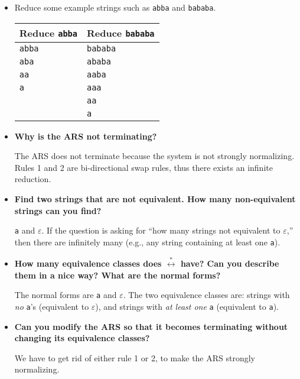 \documentclass{article}
\theoremstyle{theorem}
\theoremstyle{definition}
\theoremstyle{remark}
\begin{document}
\begin{itemize}
  \item Reduce some example strings such as \texttt{abba} and \texttt{bababa}.

  \begin{center}
  \begin{tabular}{l l}
  \textbf{Reduce \texttt{abba}} & \textbf{Reduce \texttt{bababa}}\\ \hline
  \texttt{abba}                 & \texttt{bababa} \\
  \texttt{aba}                  & \texttt{ababa}  \\
  \texttt{aa}                   & \texttt{aaba}   \\
  \texttt{a}                    & \texttt{aaa}    \\
                                & \texttt{aa}     \\
                                & \texttt{a}
  \end{tabular}
  \end{center}

  \item \textbf{Why is the ARS not terminating?}

  The ARS does not terminate because the system is not strongly normalizing. Rules 1 and 2 are bi-directional swap rules, thus there exists an infinite reduction.

  \item \textbf{Find two strings that are not equivalent. How many non-equivalent strings can you find?}

  \texttt{a} and $\varepsilon$. If the question is asking for “how many strings not equivalent to $\varepsilon$,” then there are infinitely many (e.g., any string containing at least one \texttt{a}).

  \item \textbf{How many equivalence classes does $\stackrel{\ast}{\longleftrightarrow}$ have? Can you describe them in a nice way? What are the normal forms?}

  The normal forms are \texttt{a} and $\varepsilon$. The two equivalence classes are: strings with \emph{no} \texttt{a}'s (equivalent to $\varepsilon$), and strings with \emph{at least one} \texttt{a} (equivalent to \texttt{a}).

  \item \textbf{Can you modify the ARS so that it becomes terminating without changing its equivalence classes?}

  We have to get rid of either rule 1 or 2, to make the ARS strongly normalizing.


\end{itemize}
\end{document}
